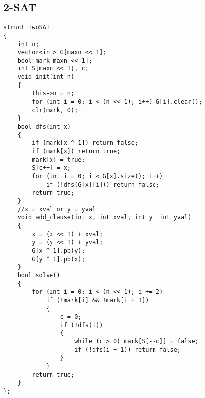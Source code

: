 \documentclass[twoside]{article}
\begin{document}
\subsection{2-SAT}
\begin{lstlisting}
struct TwoSAT
{
    int n;
    vector<int> G[maxn << 1];
    bool mark[maxn << 1];
    int S[maxn << 1], c;
    void init(int n)
    {
        this->n = n;
        for (int i = 0; i < (n << 1); i++) G[i].clear();
        clr(mark, 0);
    }
    bool dfs(int x)
    {
        if (mark[x ^ 1]) return false;
        if (mark[x]) return true;
        mark[x] = true;
        S[c++] = x;
        for (int i = 0; i < G[x].size(); i++)
            if (!dfs(G[x][i])) return false;
        return true;
    }
    //x = xval or y = yval
    void add_clause(int x, int xval, int y, int yval)
    {
        x = (x << 1) + xval;
        y = (y << 1) + yval;
        G[x ^ 1].pb(y);
        G[y ^ 1].pb(x);
    }
    bool solve()
    {
        for (int i = 0; i < (n << 1); i += 2)
            if (!mark[i] && !mark[i + 1])
            {
                c = 0;
                if (!dfs(i))
                {
                    while (c > 0) mark[S[--c]] = false;
                    if (!dfs(i + 1)) return false;
                }
            }
        return true;
    }
};
\end{lstlisting}
\end{document}
